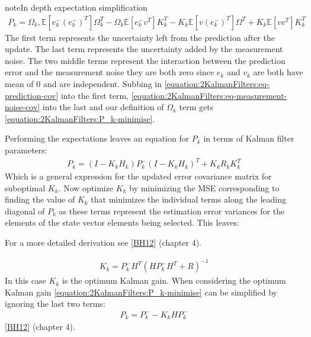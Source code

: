 \documentclass[letterpaper,10pt,english]{jupyterBook}
\begin{document}
\begin{sphinxadmonition}{note}{In depth expectation simplification}
\begin{equation}\label{equation:2KalmanFilters:eq-E5}
\begin{split}P_k =  
\Omega_k, \mathbb{E}[e^-_k (e^-_k)^T] \Omega_k^T 
- \Omega_k \mathbb{E}[e^-_k v^T] K_k^T
- K_k \mathbb{E}[v (e^-_k)^T] \Omega^T 
+ K_k \mathbb{E}[v v^T] K_k^T\end{split}
\end{equation}
\sphinxAtStartPar
The first term represents the uncertainty left from the prediction after the update. The last term represents the uncertainty added by the measurement noise. The two middle terms represent the interaction between the prediction error and the measurement noise they are both zero since \(e_k\) and \(v_k\) are both have mean of \(0\) and are independent. Subbing in \eqref{equation:2KalmanFilters:eq-prediction-cov} into the first term, \eqref{equation:2KalmanFilters:eq-measurement-noise-cov} into the last and our definition of \(\Omega_k\) term gets \eqref{equation:2KalmanFilters:P_k-minimise}.
\end{sphinxadmonition}

\sphinxAtStartPar
Performing the expectations leaves an equation for \(P_k\) in terms of Kalman filter parameters:
\begin{equation}\label{equation:2KalmanFilters:P_k-minimise}
\begin{split}P_k = (I-K_kH_k)P^-_k(I-K_kH_k)^T+K_kR_kK^T_k\end{split}
\end{equation}
\sphinxAtStartPar
Which is a general expression for the updated error covariance matrix for suboptimal \(K_k\). Now optimize \(K_k\) by minimizing the MSE corresponding to finding the value of \(K_k\) that minimizes the individual terms along the leading diagonal of \(P_k\) as these terms represent the estimation error variances for the elements of the state vector elements being selected. This leaves:

\begin{sphinxShadowBox}
\sphinxstylesidebartitle{}

\sphinxAtStartPar
For a more detailed derivation see {[}\hyperlink{cite.99Bibliography:id2}{BH12}{]} (chapter 4).
\end{sphinxShadowBox}
\begin{equation}\label{equation:2KalmanFilters:eq-kalman-gain}
\begin{split}K_k = P^-_k H^T (H P^-_k H^T + R)^{-1}\end{split}
\end{equation}
\sphinxAtStartPar
In this case \(K_k\) is the optimum Kalman gain. When considering the optimum Kalman gain \eqref{equation:2KalmanFilters:P_k-minimise} can be simplified by ignoring the last two terms:
\begin{equation}\label{equation:2KalmanFilters:eq-error-covariance-update}
\begin{split}P_k = P^-_k - K_k H P^-_k\end{split}
\end{equation}
\sphinxAtStartPar
{[}\hyperlink{cite.99Bibliography:id2}{BH12}{]} (chapter 4).
\end{document}
